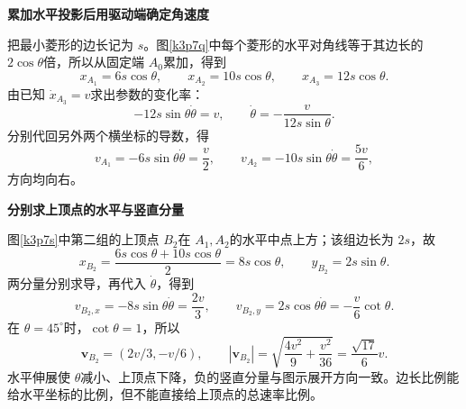 \begin{solution}\textbf{累加水平投影后用驱动端确定角速度}\par\nobreak
把最小菱形的边长记为 $s$。图\ref{k3p7q}中每个菱形的水平对角线等于其边长的 $2\cos\theta$倍，所以从固定端 $A_0$累加，得到
\[x_{A_1}=6s\cos\theta,\qquad
x_{A_2}=10s\cos\theta,\qquad x_{A_3}=12s\cos\theta.\]
由已知 $\dot x_{A_3}=v$求出参数的变化率：
\[-12s\sin\theta\dot\theta=v,\qquad
\dot\theta=-\frac{v}{12s\sin\theta}.\]
分别代回另外两个横坐标的导数，得
\[v_{A_1}=-6s\sin\theta\dot\theta=\boxed{\frac v2},\qquad
v_{A_2}=-10s\sin\theta\dot\theta=\boxed{\frac{5v}6},\]
方向均向右。



\par\medskip{}\noindent\textbf{分别求上顶点的水平与竖直分量}\par\nobreak
图\ref{k3p7s}中第二组的上顶点 $B_2$在 $A_1,A_2$的水平中点上方；该组边长为 $2s$，故
\[x_{B_2}=\frac{6s\cos\theta+10s\cos\theta}{2}=8s\cos\theta,
\qquad y_{B_2}=2s\sin\theta.\]
两分量分别求导，再代入 $\dot\theta$，得到
\[v_{B_2,x}=-8s\sin\theta\dot\theta=\frac{2v}3,\qquad
v_{B_2,y}=2s\cos\theta\dot\theta=-\frac v6\cot\theta.\]
在 $\theta=45^\circ$时，$\cot\theta=1$，所以
\[\boxed{\bm v_{B_2}=(2v/3,-v/6)},\qquad
|\bm v_{B_2}|=\sqrt{\frac{4v^2}{9}+\frac{v^2}{36}}
               =\boxed{\frac{\sqrt{17}}6v}.\]
水平伸展使 $\theta$减小、上顶点下降，负的竖直分量与图示展开方向一致。边长比例能给水平坐标的比例，但不能直接给上顶点的总速率比例。




\end{solution}
